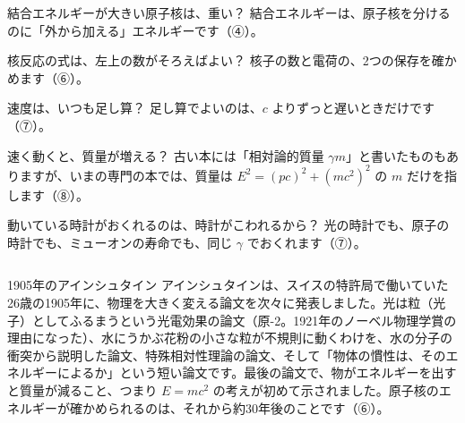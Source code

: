 \begin{tsumazuki}{結合エネルギーが大きい原子核は、重い？}
結合エネルギーは、原子核を分けるのに「外から加える」エネルギーです（④）。
\end{tsumazuki}

\begin{tsumazuki}{核反応の式は、左上の数がそろえばよい？}
核子の数と電荷の、2つの保存を確かめます（⑥）。
\end{tsumazuki}

\begin{tsumazuki}{速度は、いつも足し算？}
足し算でよいのは、$c$ よりずっと遅いときだけです（⑦）。
\end{tsumazuki}

\begin{tsumazuki}{速く動くと、質量が増える？}
古い本には「相対論的質量 $\gamma m$」と書いたものもありますが、いまの専門の本では、質量は $E^2=(pc)^2+(mc^2)^2$ の $m$ だけを指します（⑧）。
\end{tsumazuki}

\begin{tsumazuki}{動いている時計がおくれるのは、時計がこわれるから？}
光の時計でも、原子の時計でも、ミューオンの寿命でも、同じ $\gamma$ でおくれます（⑦）。
\end{tsumazuki}

\begin{column}{1905年のアインシュタイン}
アインシュタインは、スイスの特許局で働いていた26歳の1905年に、物理を大きく変える論文を次々に発表しました。光は粒（光子）としてふるまうという光電効果の論文（原-2。1921年のノーベル物理学賞の理由になった）、水にうかぶ花粉の小さな粒が不規則に動くわけを、水の分子の衝突から説明した論文、特殊相対性理論の論文、そして「物体の慣性は、そのエネルギーによるか」という短い論文です。最後の論文で、物がエネルギーを出すと質量が減ること、つまり $E=mc^2$ の考えが初めて示されました。原子核のエネルギーが確かめられるのは、それから約30年後のことです（⑥）。
\end{column}

